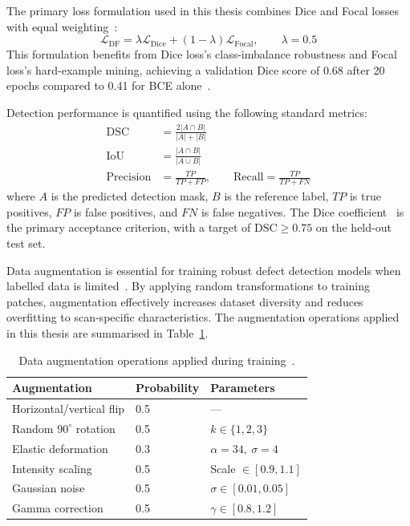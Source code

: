 The primary loss formulation used in this thesis combines Dice and Focal losses with equal
weighting~\citep{Sudre2017,Lin2017}:
\begin{equation}
\mathcal{L}_{\mathrm{DF}} = \lambda \mathcal{L}_{\mathrm{Dice}} + (1 - \lambda) \mathcal{L}_{\mathrm{Focal}},
\qquad \lambda = 0.5
\label{eq:dice_focal}
\end{equation}
This formulation benefits from Dice loss's class-imbalance robustness and Focal loss's hard-example
mining, achieving a validation Dice score of 0.68 after 20 epochs compared to 0.41 for BCE
alone~\citep{Sudre2017}.

Detection performance is quantified using the following standard metrics:
\begin{align}
\mathrm{DSC} &= \frac{2 |A \cap B|}{|A| + |B|} \label{eq:dsc} \\[4pt]
\mathrm{IoU} &= \frac{|A \cap B|}{|A \cup B|} \label{eq:iou} \\[4pt]
\mathrm{Precision} &= \frac{TP}{TP + FP}, \qquad
\mathrm{Recall} = \frac{TP}{TP + FN} \label{eq:prec_rec}
\end{align}
where $A$ is the predicted detection mask, $B$ is the reference label, $TP$ is true positives, $FP$
is false positives, and $FN$ is false negatives. The Dice coefficient~\citep{Otsu1979} is the primary
acceptance criterion, with a target of $\mathrm{DSC} \geq 0.75$ on the held-out test set.

Data augmentation is essential for training robust defect detection models when labelled data is
limited~\citep{Bellens2021}. By applying random transformations to training patches, augmentation
effectively increases dataset diversity and reduces overfitting to scan-specific characteristics. The
augmentation operations applied in this thesis are summarised in Table~\ref{tab:augmentation_ops}.

\begin{table}[htbp]
\centering
\caption{Data augmentation operations applied during training~\citep{Bellens2021}.}
\label{tab:augmentation_ops}
\begin{tabular}{lll}
\toprule
\textbf{Augmentation} & \textbf{Probability} & \textbf{Parameters} \\
\midrule
Horizontal/vertical flip & 0.5 & --- \\
Random $90^\circ$ rotation & 0.5 & $k \in \{1, 2, 3\}$ \\
Elastic deformation & 0.3 & $\alpha = 34,\ \sigma = 4$ \\
Intensity scaling & 0.5 & Scale $\in [0.9, 1.1]$ \\
Gaussian noise & 0.5 & $\sigma \in [0.01, 0.05]$ \\
Gamma correction & 0.5 & $\gamma \in [0.8, 1.2]$ \\
\bottomrule
\end{tabular}
\end{table}

